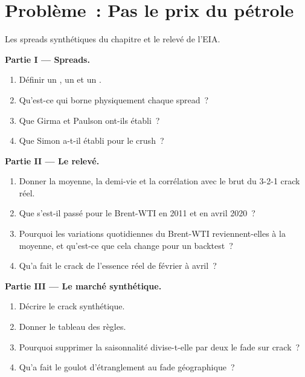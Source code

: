 \section{Problème~: Pas le prix du pétrole}

\begin{problem}\label{pb:s2:commodity-spreads:1}
Les spreads synthétiques du chapitre et le relevé de l'EIA.

\medskip\noindent\textbf{Partie I --- Spreads.}
\begin{enumerate}
\item Définir un , un  et un .
\item Qu'est-ce qui borne physiquement chaque spread~?
\item Que Girma et Paulson ont-ils établi~?
\item Que Simon a-t-il établi pour le crush~?
\end{enumerate}

\medskip\noindent\textbf{Partie II --- Le relevé.}
\begin{enumerate}[resume]
\item Donner la moyenne, la demi-vie et la corrélation avec le brut du 3-2-1 crack réel.
\item Que s'est-il passé pour le Brent-WTI en 2011 et en avril 2020~?
\item Pourquoi les variations quotidiennes du Brent-WTI reviennent-elles à la moyenne, et qu'est-ce que cela change pour un backtest~?
\item Qu'a fait le crack de l'essence réel de février à avril~?
\end{enumerate}

\medskip\noindent\textbf{Partie III --- Le marché synthétique.}
\begin{enumerate}[resume]
\item Décrire le crack synthétique.
\item Donner le tableau des règles.
\item Pourquoi supprimer la saisonnalité divise-t-elle par deux le fade sur crack~?
\item Qu'a fait le goulot d'étranglement au fade géographique~?
\end{enumerate}


\end{problem}
